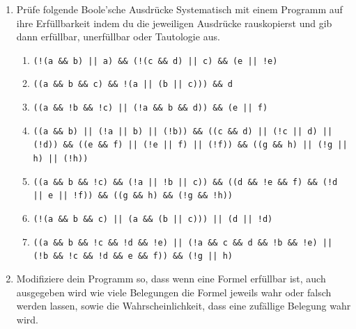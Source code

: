 \documentclass{../../sheet}
\begin{document}
\begin{enumerate}
    \item Prüfe folgende Boole'sche Ausdrücke Systematisch mit einem Programm auf ihre Erfüllbarkeit indem du die jeweiligen Ausdrücke rauskopierst und gib dann erfüllbar, unerfüllbar oder Tautologie aus.
          \begin{enumerate}
              \item \begin{ausgabe} \texttt{(!(a \&\& b) || a) \&\& (!(c \&\& d) || c) \&\& (e || !e)} \end{ausgabe} %
              \item \begin{ausgabe} \texttt{((a \&\& b \&\& c) \&\& !(a || (b || c))) \&\& d} \end{ausgabe} %
              \item \begin{ausgabe} \texttt{((a \&\& !b \&\& !c) || (!a \&\& b \&\& d)) \&\& (e || f)} \end{ausgabe} %
              \item \begin{ausgabe} \texttt{((a \&\& b) || (!a || b) || (!b)) \&\&
                            ((c \&\& d) || (!c || d) || (!d)) \&\&
                            ((e \&\& f) || (!e || f) || (!f)) \&\&
                            ((g \&\& h) || (!g || h) || (!h))}
                    \end{ausgabe} %
              \item \begin{ausgabe} \texttt{((a \&\& b \&\& !c) \&\& (!a || !b || c)) \&\&
                            ((d \&\& !e \&\& f) \&\& (!d || e || !f)) \&\&
                            ((g \&\& h) \&\& (!g \&\& !h))}
                    \end{ausgabe} %
              \item \begin{ausgabe} \texttt{(!(a \&\& b \&\& c) || (a \&\& (b || c))) || (d || !d)} \end{ausgabe} %
              \item \begin{ausgabe} \texttt{((a \&\& b \&\& !c \&\& !d \&\& !e) ||
                            (!a \&\& c \&\& d \&\& !b \&\& !e) ||
                            (!b \&\& !c \&\& !d \&\& e \&\& f)) \&\& (!g || h)}
                    \end{ausgabe} %
        \end{enumerate}
        \item Modifiziere dein Programm so, dass wenn eine Formel erfüllbar ist, auch ausgegeben wird wie viele Belegungen die Formel jeweils wahr oder falsch werden lassen, sowie die Wahrscheinlichkeit, dass eine zufällige Belegung wahr wird. 
    \end{enumerate}
\end{document}
